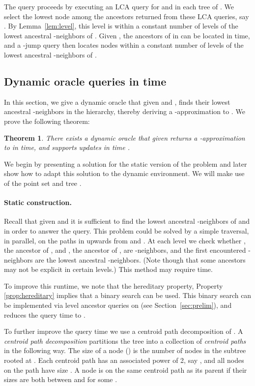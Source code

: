 \documentclass[11pt]{article}
\newtheorem{theorem}{Theorem}
\begin{document}
The query proceeds by executing an LCA query for  and  in each tree of . We
select the lowest node among the ancestors returned from these LCA queries, say .
By Lemma~\ref{lem:level}, this level is within a constant number of levels of the 
lowest ancestral -neighbors of .
Given , the ancestors of  in  can be located in  time, and a
-jump query then locates nodes within a constant number of levels of the lowest
ancestral -neighbors of .


\subsection{Dynamic oracle queries in  time}\label{sec:backup1}

In this section, we give a dynamic oracle that given  and , finds their lowest 
ancestral -neighbors in the hierarchy, thereby deriving a 
-approximation to . We prove the following theorem:

\begin{theorem}\label{thm:backup1}
There exists a dynamic oracle that given  returns a 
-approximation to
 in  time, and supports updates in time
.
\end{theorem}

We begin by presenting a solution for the static version of the problem
and later show how to adapt this solution to the dynamic environment. 
We will make use of the point set  and tree .

\paragraph{Static construction.}
Recall that given  and  it is sufficient to find the lowest
ancestral -neighbors of  and  in order to answer the query. 
This problem could be solved by a simple traversal, in parallel, on the 
paths in  upwards from  and . At each level we check 
whether , the ancestor of , and , the
ancestor of , are -neighbors, and the first encountered -neighbors are
the lowest ancestral -neighbors. (Note though that some
ancestors may not be explicit in certain levels.)
This method may require  time.

To improve this runtime, we note that the hereditary property, 
Property \ref{prop:hereditary} implies that a binary search can
be used. This binary search can be implemented via
level ancestor queries on  (see Section~\ref{sec:prelim}),
and reduces the query time to .

To further improve the query time we use a centroid path decomposition 
of . A {\em centroid path decomposition} partitions the tree  into a
collection of {\em centroid paths} in the following way. The size of a
node  () is the number of nodes in the subtree rooted at . Each
centroid path has an associated power of 2, say , and all nodes on
the path have size . A node  is on the same
centroid path as its parent if their sizes are both between  and
 for some .
\end{document}

